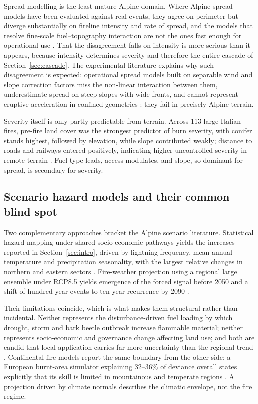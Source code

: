 \documentclass[11pt,a4paper]{article}
\begin{document}
Spread modelling is the least mature Alpine domain. Where Alpine spread models have been evaluated against real events, they agree on perimeter but diverge substantially on fireline intensity and rate of spread, and the models that resolve fine-scale fuel--topography interaction are not the ones fast enough for operational use \citep{malanchini_modeling_2025}. That the disagreement falls on intensity is more serious than it appears, because intensity determines severity and therefore the entire cascade of Section~\ref{sec:cascade}. The experimental literature explains why such disagreement is expected: operational spread models built on separable wind and slope correction factors miss the non-linear interaction between them, underestimate spread on steep slopes with wide fronts, and cannot represent eruptive acceleration in confined geometries \citep{hayajneh_wind_2026}: they fail in precisely Alpine terrain.

Severity itself is only partly predictable from terrain. Across 113 large Italian fires, pre-fire land cover was the strongest predictor of burn severity, with conifer stands highest, followed by elevation, while slope contributed weakly; distance to roads and railways entered positively, indicating higher uncontrolled severity in remote terrain \citep{malandra_burn_2022}. Fuel type leads, access modulates, and slope, so dominant for spread, is secondary for severity.

\subsection{Scenario hazard models and their common blind spot}

Two complementary approaches bracket the Alpine scenario literature. Statistical hazard mapping under shared socio-economic pathways yields the increases reported in Section~\ref{sec:intro}, driven by lightning frequency, mean annual temperature and precipitation seasonality, with the largest relative changes in northern and eastern sectors \citep{gerberding_mapping_2025}. Fire-weather projection using a regional large ensemble under RCP8.5 yields emergence of the forced signal before 2050 and a shift of hundred-year events to ten-year recurrence by 2090 \citep{miller_climate_2024}.

Their limitations coincide, which is what makes them structural rather than incidental. Neither represents the disturbance-driven fuel loading by which drought, storm and bark beetle outbreak increase flammable material; neither represents socio-economic and governance change affecting land use; and both are candid that local application carries far more uncertainty than the regional trend \citep{gerberding_mapping_2025}. Continental fire models report the same boundary from the other side: a European burnt-area simulator explaining 32--36\% of deviance overall states explicitly that its skill is limited in mountainous and temperate regions \citep{forrest_understanding_2024}. A projection driven by climate normals describes the climatic envelope, not the fire regime.
\end{document}

